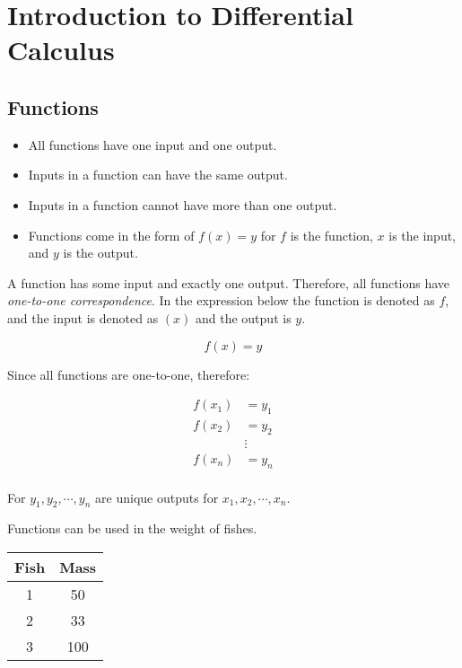 
\chapter{Introduction to Differential Calculus}

\section{Functions}

\begin{tcolorbox}[colback=blue!10!white,colframe=blue!60!black,title=Main Ideas]
    \begin{itemize}
        \item All functions have one input and one output.
        \item Inputs in a function can have the same output.
        \item Inputs in a function cannot have more than one output.
        \item Functions come in the form of \(f(x)=y\) for \(f\) is the function, \(x\) is the input, and \(y\) is the output.
    \end{itemize}
\end{tcolorbox}

A function has some input and exactly one output. Therefore, all functions have \emph{one-to-one correspondence}. In the expression below the function is denoted as \(f\), and the input is denoted as \((x)\) and the output is \(y\).

\[
    f(x) = y
\]

Since all functions are one-to-one, therefore:

\begin{align*}
    f(x_1) &= y_1 \\ 
    f(x_2) &= y_2 \\
           &\vdots \\
    f(x_n) &= y_n \\
\end{align*}

For \(y_1, y_2, \cdots, y_n\) are unique outputs for \(x_1, x_2, \cdots, x_n\).

\begin{ex}
    \label{ex1}
    Functions can be used in the weight of fishes.
\end{ex}

\begin{center}
    \begin{tabular}{cc}
        \toprule
        Fish & Mass \\
        \midrule
        1 & 50 \\
        2 & 33 \\
        3 & 100 \\
        \bottomrule
    \end{tabular}
    \label{tb1}
\end{center}

